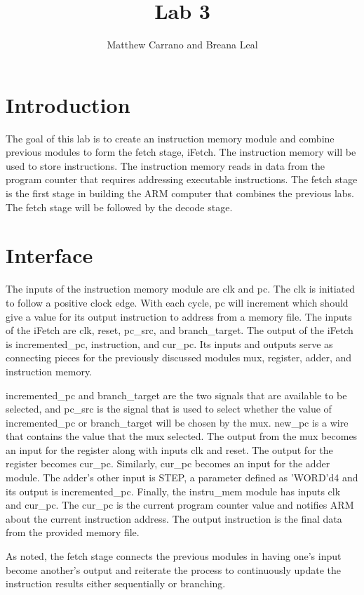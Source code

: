 \documentclass{article}
\author{Matthew Carrano and Breana Leal}
\title{Lab 3}
\begin{document}
\maketitle

\section{Introduction}
The goal of this lab is to create an instruction memory module and combine previous modules to form the fetch stage, iFetch.  The instruction memory  will be used to store instructions. The instruction memory reads in data from the program counter that requires addressing executable instructions. The fetch stage is the first stage in building the ARM computer that combines the previous labs. The fetch stage will be followed by the decode stage.

\section{Interface}
The inputs of the instruction memory module are clk and pc. The clk is initiated to follow a positive clock edge. With each cycle, pc will increment which should give a value for its output instruction to address from a memory file.  
The inputs of the iFetch are clk, reset, pc\_src, and branch\_target. The output of the iFetch is incremented\_pc, instruction, and cur\_pc. Its inputs and outputs serve as connecting pieces for the previously discussed modules mux, register, adder, and instruction memory.

incremented\_pc and branch\_target are the two signals that are available to be selected, and pc\_src is the signal that is used to select whether the value of incremented\_pc or branch\_target will be chosen by the mux. new\_pc is a wire that contains the value that the mux selected. The output from the mux becomes an input for the register along with inputs clk and reset. The output for the register becomes cur\_pc. Similarly, cur\_pc becomes an input for the adder module. The adder's other input is STEP, a parameter defined as 'WORD'd4 and its output is incremented\_pc. Finally, the instru\_mem module has inputs clk and cur\_pc. The cur\_pc is the current program counter value and notifies ARM about the current instruction address. The output instruction is the final data from the provided memory file. 

As noted, the fetch stage connects the previous modules in having one's input become another's output and reiterate the process to continuously update the instruction results either sequentially or branching.
\end{document}

